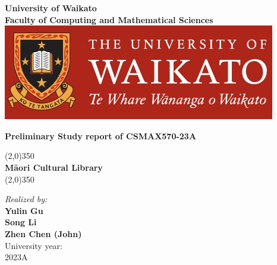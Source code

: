 \begin{titlepage}
  \begin{center}
  \thispagestyle{emptyt}
  \textbf{\Large University of Waikato\\[0.07cm]Faculty of Computing and Mathematical Sciences }\\ [0.3cm]
  
  \includegraphics[scale=0.2]{./Images/UoW.jpg}~\\
  
  \vspace{2cm}
  
  \textbf{\Large Preliminary Study report of CSMAX570-23A}\\[0.2cm]
  
  \vspace{0.4cm}
  \hspace{0.3cm}
  
  \begin{center}
  \line(2,0){350}\\
  \vspace*{0.5cm} \textbf{{\LARGE{Māori Cultural Library }}}\\
  \vspace*{0.5cm}\line(2,0){350}\\
  \end{center}
  
  \hspace{0.7cm}
    
   \large \emph{Realized by:}\\
  \textbf{\Large{Yulin Gu}} \\[0.5cm]
  \textbf{\Large{Song Li}} \\[0.5cm]
  \textbf{\Large{Zhen Chen (John)}} \\[0.5cm]
  
   
  
  \vfill
  {\large University year:}\\
  {\large 2023A}
  
  
  \end{center}
  \end{titlepage}
  